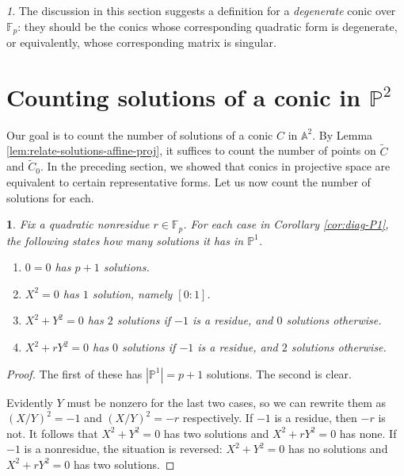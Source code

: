 \documentclass[10pt,a4paper]{amsart}
\numberwithin{equation}{section}
\numberwithin{figure}{section}
\theoremstyle{definition}
\theoremstyle{remark}
\newtheorem*{rem*}{\protect\remarkname}
\theoremstyle{plain}
\theoremstyle{plain}
\theoremstyle{definition}
\theoremstyle{plain}
\newtheorem{prop}{\protect\propositionname}[section]
\theoremstyle{plain}
\providecommand{\propositionname}{Proposition}
\providecommand{\remarkname}{Remark}
\newcommand{\A}{\mathbb{A}}
\renewcommand{\P}{\mathbb{P}}
\newcommand{\F}{\mathbb{F}}
\begin{document}
	\begin{rem*}
		The discussion in this section suggests a definition for a \emph{degenerate} conic over $\F_p$: they should be the conics whose corresponding quadratic form is degenerate, or equivalently, whose corresponding matrix is singular.
	\end{rem*}

    \section{Counting solutions of a conic in $\P^2$}\label{sec:proj-solutions}
	Our goal is to count the number of solutions of a conic $C$ in $\A^2$. By Lemma \ref{lem:relate-solutions-affine-proj}, it suffices to count the number of points on $\widetilde{C}$ and $\widetilde{C}_0$. In the preceding section, we showed that conics in projective space are equivalent to certain representative forms. Let us now count the number of solutions for each.
	\begin{prop}\label{prop:counting-P1-solutions}
		Fix a quadratic nonresidue $r \in \F_p$. For each case in Corollary \ref{cor:diag-P1}, the following states how many solutions it has in $\P^1$.
		\begin{enumerate} 
			\item $0 = 0$ has $p+1$ solutions.
			\item $X^2 = 0$ has $1$ solution, namely $[0:1]$.
			\item $X^2 + Y^2 = 0$ has $2$ solutions if $-1$ is a residue, and $0$ solutions otherwise. \label{case:x^2+y^2=0}
			\item $X^2 + rY^2 = 0$ has $0$ solutions if $-1$ is a residue, and $2$ solutions otherwise.
		\end{enumerate}
	\end{prop}
	\begin{proof}
		The first of these has $|\P^1| = p+1$ solutions. The second is clear.
		
		Evidently $Y$ must be nonzero for the last two cases, so we can rewrite them as
		$(X/Y)^2 = -1$ and $(X/Y)^2 = -r$ respectively. If $-1$ is a residue,
		then $-r$ is not. It follows that $X^2 + Y^2 = 0$ has two solutions and $X^2 +
		rY^2 = 0$ has none. If $-1$ is a nonresidue, the situation is reversed: $X^2 +
		Y^2 = 0$ has no solutions and $X^2 + rY^2 = 0$ has two solutions.
	\end{proof}
\end{document}
